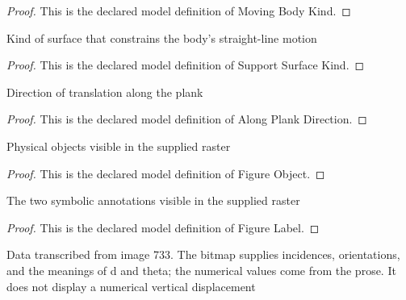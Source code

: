 \begin{proof}
  This is the declared model definition of Moving Body Kind.
\end{proof}
\begin{definition}
  \label{def:physics:phyx-mini-0733:phyxminiproblems-problemphyxmini0733-supportsurfacekind}
  Kind of surface that constrains the body's straight-line motion
\end{definition}
\begin{proof}
  This is the declared model definition of Support Surface Kind.
\end{proof}
\begin{definition}
  \label{def:physics:phyx-mini-0733:phyxminiproblems-problemphyxmini0733-alongplankdirection}
  Direction of translation along the plank
\end{definition}
\begin{proof}
  This is the declared model definition of Along Plank Direction.
\end{proof}
\begin{definition}
  \label{def:physics:phyx-mini-0733:phyxminiproblems-problemphyxmini0733-figureobject}
  Physical objects visible in the supplied raster
\end{definition}
\begin{proof}
  This is the declared model definition of Figure Object.
\end{proof}
\begin{definition}
  \label{def:physics:phyx-mini-0733:phyxminiproblems-problemphyxmini0733-figurelabel}
  The two symbolic annotations visible in the supplied raster
\end{definition}
\begin{proof}
  This is the declared model definition of Figure Label.
\end{proof}
\begin{definition}
  \label{def:physics:phyx-mini-0733:phyxminiproblems-problemphyxmini0733-suppliedinclinedplankfigure}
  Data transcribed from image 733. The bitmap supplies incidences, orientations, and the meanings of d and theta; the numerical values come from the prose. It does not display a numerical vertical displacement
\end{definition}
